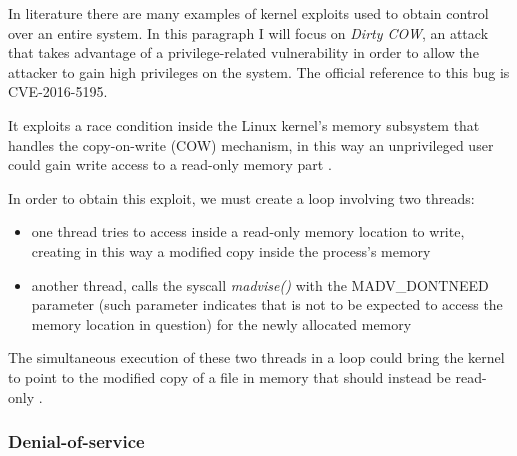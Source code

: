 \documentclass[a4paper,12pt]{article}
\begin{document}
In literature there are many examples of kernel exploits used to obtain control
over an entire system. In this paragraph I will focus on \textit{Dirty COW}, an
attack that takes advantage of a privilege-related vulnerability in order to
allow the attacker to gain high privileges on the system. The official reference
to this bug is CVE-2016-5195.\par It exploits a race condition inside the Linux
kernel's memory subsystem that handles the copy-on-write (COW) mechanism, in
this way an unprivileged user could gain write access to a read-only memory part
\cite{red_hat_dirtycow}.\par In order to obtain this exploit, we must create a
loop involving two threads:
\begin{itemize}
  \item one thread tries to access inside a read-only memory location to
  write, creating in this way a modified copy inside the process's memory
  \item another thread, calls the syscall \textit{madvise()}
  \cite{madvise_description} with the MADV\_DONTNEED parameter (such parameter
  indicates that is not to be expected to access the memory location in
  question) for the newly allocated memory
  \end{itemize}
The simultaneous execution of these two threads in a loop could bring the
kernel to point to the modified copy of a file in memory that should instead be
read-only \cite{dirtycow_how_it_worrks}.

\subsubsection{Denial-of-service}
\end{document}
